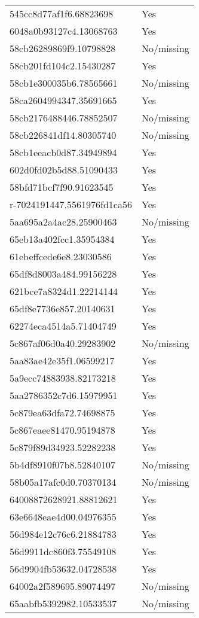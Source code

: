 \begin{tabular}{ll}
545cc8d77af1f6.68823698 & Yes \\
6048a0b93127c4.13068763 & Yes \\
58cb26289869f9.10798828 & No/missing \\
58cb201fd104c2.15430287 & Yes \\
58cb1e300035b6.78565661 & No/missing \\
58ca2604994347.35691665 & Yes \\
58cb2176488446.78852507 & No/missing \\
58cb226841df14.80305740 & No/missing \\
58cb1eeacb0d87.34949894 & Yes \\
602d0fd02b5d88.51090433 & Yes \\
58bfd71bcf7f90.91623545 & Yes \\
r-7024191447.5561976fd1ca56 & Yes \\
5aa695a2a4ac28.25900463 & No/missing \\
65eb13a402fcc1.35954384 & Yes \\
61ebeffcede6e8.23030586 & Yes \\
65df8d8003a484.99156228 & Yes \\
621bce7a8324d1.22214144 & Yes \\
65df8e7736e857.20140631 & Yes \\
62274eca4514a5.71404749 & Yes \\
5c867af06d0a40.29283902 & No/missing \\
5aa83ae42e35f1.06599217 & Yes \\
5a9ecc74883938.82173218 & Yes \\
5aa2786352c7d6.15979951 & Yes \\
5c879ea63dfa72.74698875 & Yes \\
5c867eaee81470.95194878 & Yes \\
5c879f89d34923.52282238 & Yes \\
5b4df8910f07b8.52840107 & No/missing \\
58b05a17afc0d0.70370134 & No/missing \\
64008872628921.88812621 & Yes \\
63e6648eae4d00.04976355 & Yes \\
56d984e12c76c6.21884783 & Yes \\
56d9911dc860f3.75549108 & Yes \\
56d9904fb53632.04728538 & Yes \\
64002a2f589695.89074497 & No/missing \\
65aabfb5392982.10533537 & No/missing \\

\end{tabular}
